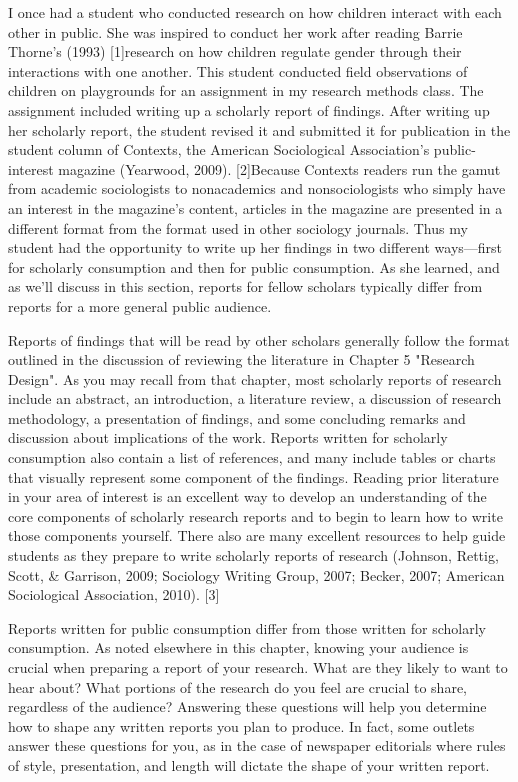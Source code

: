 I once had a student who conducted research on how children interact with each other in public. She was inspired to conduct her work after reading Barrie Thorne’s (1993) [1]research on how children regulate gender through their interactions with one another. This student conducted field observations of children on playgrounds for an assignment in my research methods class. The assignment included writing up a scholarly report of findings. After writing up her scholarly report, the student revised it and submitted it for publication in the student column of Contexts, the American Sociological Association’s public-interest magazine (Yearwood, 2009). [2]Because Contexts readers run the gamut from academic sociologists to nonacademics and nonsociologists who simply have an interest in the magazine’s content, articles in the magazine are presented in a different format from the format used in other sociology journals. Thus my student had the opportunity to write up her findings in two different ways—first for scholarly consumption and then for public consumption. As she learned, and as we’ll discuss in this section, reports for fellow scholars typically differ from reports for a more general public audience.

Reports of findings that will be read by other scholars generally follow the format outlined in the discussion of reviewing the literature in Chapter 5 "Research Design". As you may recall from that chapter, most scholarly reports of research include an abstract, an introduction, a literature review, a discussion of research methodology, a presentation of findings, and some concluding remarks and discussion about implications of the work. Reports written for scholarly consumption also contain a list of references, and many include tables or charts that visually represent some component of the findings. Reading prior literature in your area of interest is an excellent way to develop an understanding of the core components of scholarly research reports and to begin to learn how to write those components yourself. There also are many excellent resources to help guide students as they prepare to write scholarly reports of research (Johnson, Rettig, Scott, \& Garrison, 2009; Sociology Writing Group, 2007; Becker, 2007; American Sociological Association, 2010). [3]

Reports written for public consumption differ from those written for scholarly consumption. As noted elsewhere in this chapter, knowing your audience is crucial when preparing a report of your research. What are they likely to want to hear about? What portions of the research do you feel are crucial to share, regardless of the audience? Answering these questions will help you determine how to shape any written reports you plan to produce. In fact, some outlets answer these questions for you, as in the case of newspaper editorials where rules of style, presentation, and length will dictate the shape of your written report.

